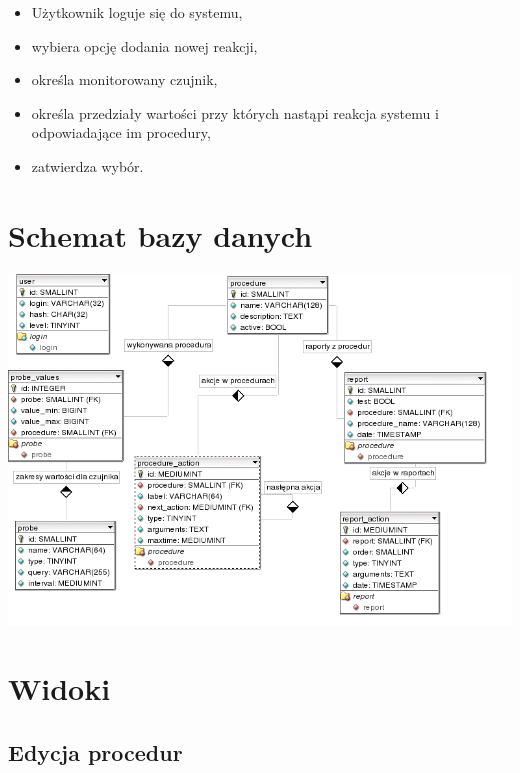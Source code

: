 \documentclass[a4paper,12pt]{article}
\begin{document}
\begin{itemize}
	\item Użytkownik loguje się do systemu,

	\item wybiera opcję dodania nowej reakcji,

	\item określa monitorowany czujnik,

	\item określa przedziały wartości przy których nastąpi reakcja systemu i odpowiadające im procedury,

	\item zatwierdza wybór.
\end{itemize}


\section{Schemat bazy danych}

\begin{center}
	\includegraphics[width=135mm]{db-schema.png}
\end{center}


\section{Widoki}

\subsection{Edycja procedur}
\end{document}
